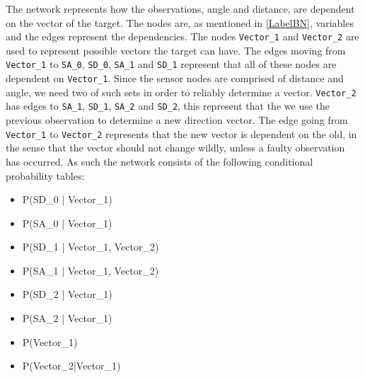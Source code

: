 The network represents how the observations, angle and distance, are dependent
on the vector of the target. The nodes are, as mentioned in \autoref{LabelBN},
variables and the edges represent the dependencies. The nodes
\texttt{Vector\_1} and \texttt{Vector\_2} are used to represent possible
vectors the target can have. The edges moving from \texttt{Vector\_1} to
\texttt{SA\_0}, \texttt{SD\_0}, \texttt{SA\_1} and \texttt{SD\_1} represent
that all of these nodes are dependent on \texttt{Vector\_1}. Since the sensor
nodes are comprised of distance and angle, we need two of such sets in order to
reliably determine a vector. \texttt{Vector\_2} has edges to \texttt{SA\_1},
\texttt{SD\_1}, \texttt{SA\_2} and \texttt{SD\_2}, this represent that the we
use the previous observation to determine a new direction vector. The edge
going from \texttt{Vector\_1} to \texttt{Vector\_2} represents that the new
vector is dependent on the old, in the sense that the vector should not change wildly,
unless a faulty observation has occurred. As such the network consists of the
following conditional probability tables:
\begin{itemize}
  \item P(SD\_0 | Vector\_1)
  \item P(SA\_0 | Vector\_1)
  \item P(SD\_1 | Vector\_1, Vector\_2)
  \item P(SA\_1 | Vector\_1, Vector\_2)
  \item P(SD\_2 | Vector\_1)
  \item P(SA\_2 | Vector\_1)
  \item P(Vector\_1)
  \item P(Vector\_2|Vector\_1)
\end{itemize} 
